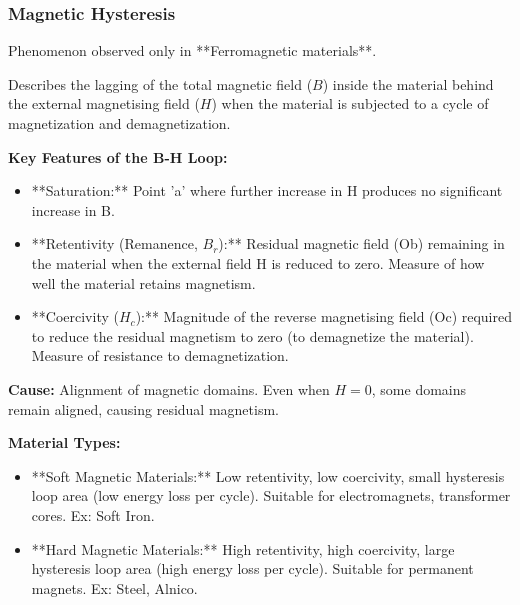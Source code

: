\begin{frame}[t]
    \frametitle{\textcolor{deepnavy}{\textbf{Magnetic Hysteresis}}}
    \renewcommand{\familydefault}{\rmdefault}
    \small

      \item<+-> Phenomenon observed only in **Ferromagnetic materials**.
      \item<+-> Describes the lagging of the total magnetic field ($B$) inside the material behind the external magnetising field ($H$) when the material is subjected to a cycle of magnetization and demagnetization. %

    \item<+-> \textbf{Key Features of the B-H Loop:}
        \begin{itemize}[<+->]
              \item **Saturation:** Point 'a' where further increase in H produces no significant increase in B.
              \item **Retentivity (Remanence, $B_r$):** Residual magnetic field (Ob) remaining in the material when the external field H is reduced to zero. Measure of how well the material retains magnetism.
              \item **Coercivity ($H_c$):** Magnitude of the reverse magnetising field (Oc) required to reduce the residual magnetism to zero (to demagnetize the material). Measure of resistance to demagnetization.
        \end{itemize}

    \item<+-> \textbf{Cause:} Alignment of magnetic domains.   Even when $H=0$, some domains remain aligned, causing residual magnetism.

      \item<+-> \textbf{Material Types:}
        \begin{itemize}[<+->]
              \item **Soft Magnetic Materials:** Low retentivity, low coercivity, small hysteresis loop area (low energy loss per cycle). Suitable for electromagnets, transformer cores.   Ex: Soft Iron.
              \item **Hard Magnetic Materials:** High retentivity, high coercivity, large hysteresis loop area (high energy loss per cycle). Suitable for permanent magnets.   Ex: Steel, Alnico.
        \end{itemize}
\end{frame}

